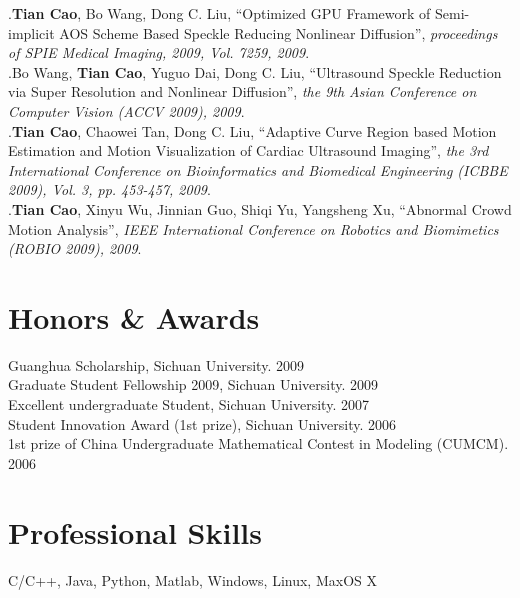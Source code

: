 \documentclass[line,margin]{res}
\begin{document}
\begin{resume}
[1].\textbf{Tian Cao}, Bo Wang, Dong C. Liu, ``Optimized GPU Framework of Semi-implicit AOS
Scheme Based Speckle Reducing Nonlinear Diﬀusion'',  \emph{proceedings of SPIE Medical Imaging, 2009, Vol. 7259, 2009}.\vspace{.1in}\\
\smallskip
[2].Bo Wang, \textbf{Tian Cao}, Yuguo Dai, Dong C. Liu, ``Ultrasound Speckle Reduction via Super Resolution and Nonlinear Diffusion'',  \emph{the 9th Asian Conference on Computer Vision (ACCV 2009), 2009}. \vspace{.1in}\\
\smallskip
[3].\textbf{Tian Cao}, Chaowei Tan, Dong C. Liu, ``Adaptive Curve Region based Motion Estimation and Motion Visualization of Cardiac Ultrasound Imaging'',  \emph{the 3rd International Conference on Bioinformatics and Biomedical Engineering (ICBBE 2009), Vol. 3, pp. 453-457, 2009}.\vspace{.1in}\\
\smallskip
[4].\textbf{Tian Cao}, Xinyu Wu, Jinnian Guo, Shiqi Yu, Yangsheng Xu, ``Abnormal Crowd Motion Analysis'', \emph{IEEE International Conference on Robotics and Biomimetics (ROBIO 2009), 2009}.

 
\section{\sc Honors \& Awards}
\smallskip


Guanghua Scholarship, Sichuan University.  \hfill       2009 \\
Graduate Student Fellowship 2009, Sichuan University.  \hfill       2009 \\
Excellent undergraduate Student, Sichuan University.  \hfill       2007\\
Student Innovation Award (1st prize), Sichuan University.  \hfill       2006 \\
1st prize of China Undergraduate Mathematical Contest in Modeling (CUMCM).  \hfill       2006

\section{\sc Professional Skills}
\smallskip

C/C++, Java, Python, Matlab, Windows, Linux, MaxOS X

\end{resume}

%
%
\end{document}
